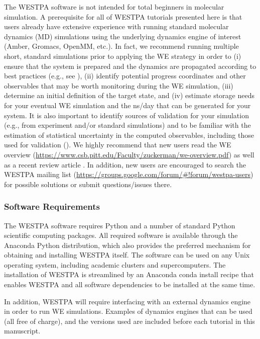 \documentclass[9pt,tutorial,ASAPversion]{livecoms}
\begin{document}
The WESTPA software is not intended for total beginners in molecular simulation. 
A prerequisite for all of WESTPA tutorials presented here is that users already have extensive experience with running standard molecular dynamics (MD) simulations using the underlying dynamics engine of interest (Amber, Gromacs, OpenMM, etc.). 
In fact, we recommend running multiple short, standard simulations prior to applying the WE strategy in order to (i) ensure that the system is prepared and the dynamics are propagated according to best practices (e.g., see \citep{Mobley2019}), (ii) identify potential progress coordinates and other observables that may be worth monitoring during the WE simulation, (iii) determine an initial definition of the target state, and (iv) estimate storage needs for your eventual WE simulation and the ns/day that can be generated for your system. 
It is also important to identify sources of validation for your simulation (e.g., from experiment and/or standard simulations) and to be familiar with the estimation of statistical uncertainty in the computed observables, including those used for validation (\citep{Grossfield2019}). 
We highly recommend that new users read the WE overview (\url{https://www.csb.pitt.edu/Faculty/zuckerman/we-overview.pdf}) as well as a recent review article \citep{ZuckermanChong2017}. 
In addition, new users are encouraged to search the WESTPA mailing list (\url{https://groups.google.com/forum/#!forum/westpa-users}) for possible solutions or submit questions/issues there.

\subsubsection{Software Requirements}

The WESTPA software requires Python and a number of standard Python scientific computing packages. 
All required software is available through the Anaconda Python distribution, which also provides the preferred mechanism for obtaining and installing WESTPA itself. 
The software can be used on any Unix operating system, including academic clusters and supercomputers. 
The installation of WESTPA is streamlined by an Anaconda conda install recipe that enables WESTPA and all software dependencies to be installed at the same time.

In addition, WESTPA will require interfacing with an external dynamics engine in order to run WE simulations.  Examples of dynamics engines that can be used (all free of charge), and the versions used are included before each tutorial in this manuscript.
\end{document}
